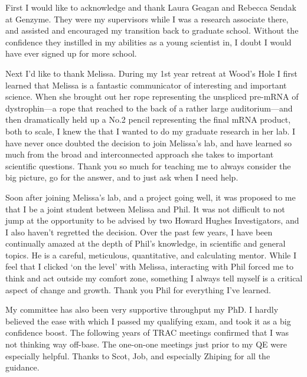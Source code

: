 

\acknowledgements{}

\label{hd:acknowledgements}
First I would like to acknowledge and thank Laura Geagan and Rebecca Sendak at Genzyme. They were my supervisors while I was a research associate there, and assisted and encouraged my transition back to graduate school. Without the confidence they instilled in my abilities as a young scientist in, I doubt I would have ever signed up for more school. 

Next I’d like to thank Melissa. During my 1st year retreat at Wood’s Hole I first learned that Melissa is a fantastic communicator of interesting and important science. When she brought out her rope representing the unspliced pre-mRNA of dystrophin—a rope that reached to the back of a rather large auditorium—and then dramatically held up a No.2 pencil representing the final mRNA product, both to scale, I knew the that I wanted to do my graduate research in her lab. I have never once doubted the decision to join Melissa’s lab, and have learned so much from the broad and interconnected approach she takes to important scientific questions. Thank you so much for teaching me to always consider the big picture, go for the answer, and to just ask when I need help.

Soon after joining Melissa’s lab, and a project going well, it was proposed to me that I be a joint student between Melissa and Phil. It was not difficult to not jump at the opportunity to be advised by two Howard Hughes Investigators, and I also haven’t regretted the decision. Over the past few years, I have been continually amazed at the depth of Phil’s knowledge, in scientific and general topics. He is a careful, meticulous, quantitative, and calculating mentor. While I feel that I clicked ‘on the level’ with Melissa, interacting with Phil forced me to think and act outside my comfort zone, something I always tell myself is a critical aspect of change and growth. Thank you Phil for everything I’ve learned.

My committee has also been very supportive throughput my PhD. I hardly believed the ease with which I passed my qualifying exam, and took it as a big confidence boost. The following years of TRAC meetings confirmed that I was not thinking way off-base. The one-on-one meetings just prior to my QE were especially helpful. Thanks to Scot, Job, and especially Zhiping for all the guidance.

